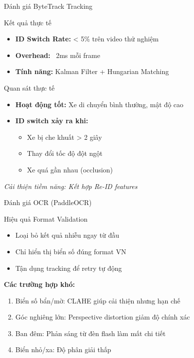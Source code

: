 \begin{frame}{Đánh giá ByteTrack Tracking}
    \begin{block}{Kết quả thực tế}
    \begin{itemize}
        \item \textbf{ID Switch Rate:} < 5\% trên video thử nghiệm
        \item \textbf{Overhead:} ~2ms mỗi frame
        \item \textbf{Tính năng:} Kalman Filter + Hungarian Matching
    \end{itemize}
    \end{block}

    \begin{block}{Quan sát thực tế}
    \begin{itemize}
        \item \textbf{Hoạt động tốt:} Xe di chuyển bình thường, mật độ cao
        \item \textbf{ID switch xảy ra khi:}
        \begin{itemize}
            \item Xe bị che khuất > 2 giây
            \item Thay đổi tốc độ đột ngột
            \item Xe quá gần nhau (occlusion)
        \end{itemize}
    \end{itemize}
    \end{block}

    \textit{Cải thiện tiềm năng: Kết hợp Re-ID features}
\end{frame}

\begin{frame}{Đánh giá OCR (PaddleOCR)}
    \begin{block}{Hiệu quả Format Validation}
    \begin{itemize}
        \item Loại bỏ kết quả nhiễu ngay từ đầu
        \item Chỉ hiển thị biển số đúng format VN
        \item Tận dụng tracking để retry tự động
    \end{itemize}
    \end{block}

    \textbf{Các trường hợp khó:}
    \begin{enumerate}
        \item Biển số bẩn/mờ: CLAHE giúp cải thiện nhưng hạn chế
        \item Góc nghiêng lớn: Perspective distortion giảm độ chính xác
        \item Ban đêm: Phản sáng từ đèn flash làm mất chi tiết
        \item Biển nhỏ/xa: Độ phân giải thấp
    \end{enumerate}
\end{frame}
